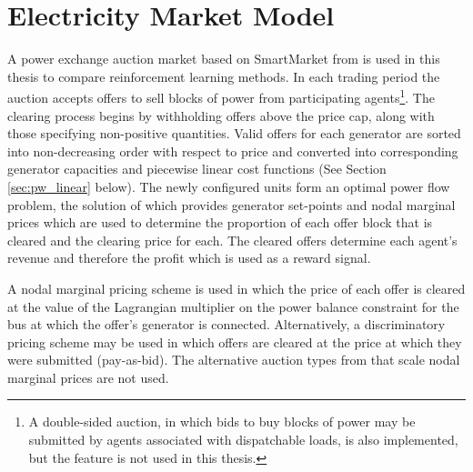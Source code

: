 \section{Electricity Market Model}
A power exchange auction market based on SmartMarket from
 is used in this thesis to compare reinforcement
learning methods.  In each trading period the auction accepts offers to sell
blocks of power from participating agents\footnote{A double-sided auction,
in which bids to buy blocks of power may be submitted by agents associated
with dispatchable loads, is also implemented, but the feature is not used in
this thesis.}.
The clearing process begins by withholding offers above the price cap, along
with those specifying non-positive quantities.  Valid offers for each
generator are sorted into non-decreasing order with respect to price and
converted into corresponding generator capacities and piecewise linear cost
functions (See Section \ref{sec:pw_linear} below).  The newly configured units
form an optimal power flow problem, the solution of which provides generator
set-points and nodal marginal prices which are used to determine the
proportion of each offer block that is cleared and the clearing price for each.
The cleared offers determine each agent's revenue and therefore the profit
which is used as a reward signal.


A nodal marginal pricing scheme is used in which the price of each offer is
cleared at the value of the Lagrangian multiplier on the power balance
constraint for the bus at which the offer's generator is connected.
Alternatively, a discriminatory pricing scheme may be used in which offers are
cleared at the price at which they were submitted (pay-as-bid).  The
alternative auction types from \matpower that scale nodal marginal prices
are not used.

